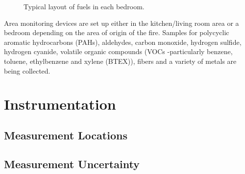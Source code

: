 \documentclass[12pt,oneside]{book}
\begin{document}
\begin{figure}[H]
	\centering
	\hfill
	\hfill
	\caption[Bedroom Fuel Photographs]{Typical layout of fuels in each bedroom.}
	\label{fig:br_fuel}
\end{figure}

\FloatBarrier

Area monitoring devices are set up either in the kitchen/living room area or a bedroom depending on the area of origin of the fire.  Samples for polycyclic aromatic hydrocarbons (PAHs), aldehydes, carbon monoxide, hydrogen sulfide, hydrogen cyanide, volatile organic compounds (VOCs -particularly benzene, toluene, ethylbenzene and xylene (BTEX)), fibers and a variety of metals are being collected.  

\section{Instrumentation}
\label{sec:instrument}

\subsection{Measurement Locations}
\label{subsec:measure_locs}

\subsection{Measurement Uncertainty}
\label{subsec:uncertainty}
\end{document}
